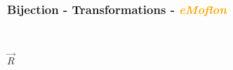 \documentclass{beamer}
\begin{document}
\begin{frame}
\frametitle{Bijection - \textbf{Transformations} - \textbf{\textit{\textcolor{orange}{eMoflon}}}}
\begin{figure}[ht]
\begin{mdframed}
    \centering
    \mbox{\qquad\qquad\qquad
          }
\end{mdframed}          
    \label{fig:T1}
\end{figure}

\begin{center}
$\overrightarrow{R}$
\end{center}

\begin{figure}[ht]
    \centering
    \mbox{
          }
    \label{fig:T3}
\end{figure}

\end{frame}
\end{document}
